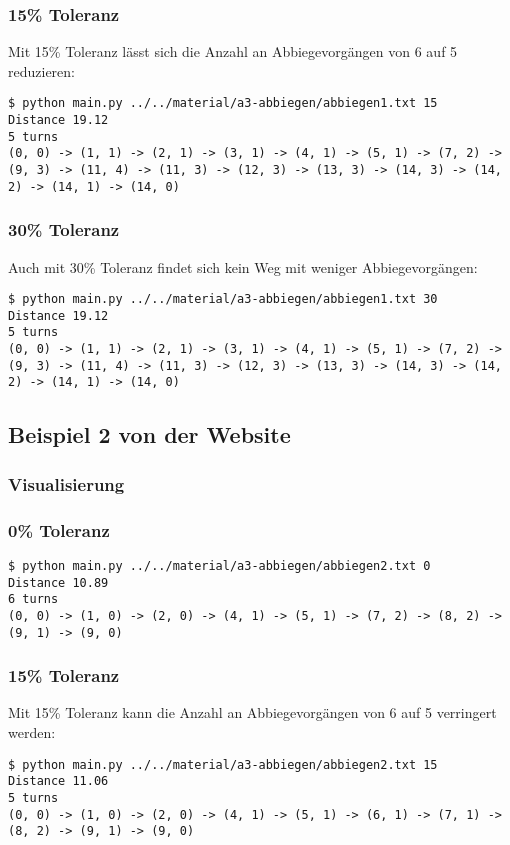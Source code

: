 \documentclass[a4paper,10pt,ngerman]{scrartcl}
\begin{document}
\subsubsection{15\% Toleranz}
Mit 15\% Toleranz lässt sich die Anzahl an Abbiegevorgängen von 6 auf 5 reduzieren:
\begin{lstlisting}
$ python main.py ../../material/a3-abbiegen/abbiegen1.txt 15
Distance 19.12
5 turns
(0, 0) -> (1, 1) -> (2, 1) -> (3, 1) -> (4, 1) -> (5, 1) -> (7, 2) -> (9, 3) -> (11, 4) -> (11, 3) -> (12, 3) -> (13, 3) -> (14, 3) -> (14, 2) -> (14, 1) -> (14, 0)
\end{lstlisting}

\subsubsection{30\% Toleranz}
Auch mit 30\% Toleranz findet sich kein Weg mit weniger Abbiegevorgängen:
\begin{lstlisting}
$ python main.py ../../material/a3-abbiegen/abbiegen1.txt 30
Distance 19.12
5 turns
(0, 0) -> (1, 1) -> (2, 1) -> (3, 1) -> (4, 1) -> (5, 1) -> (7, 2) -> (9, 3) -> (11, 4) -> (11, 3) -> (12, 3) -> (13, 3) -> (14, 3) -> (14, 2) -> (14, 1) -> (14, 0)
\end{lstlisting}


\subsection{Beispiel 2 von der Website}
\subsubsection{Visualisierung}


\subsubsection{0\% Toleranz}
\begin{lstlisting}
$ python main.py ../../material/a3-abbiegen/abbiegen2.txt 0
Distance 10.89
6 turns
(0, 0) -> (1, 0) -> (2, 0) -> (4, 1) -> (5, 1) -> (7, 2) -> (8, 2) -> (9, 1) -> (9, 0)
\end{lstlisting}

\subsubsection{15\% Toleranz}
Mit 15\% Toleranz kann die Anzahl an Abbiegevorgängen von 6 auf 5 verringert werden:
\begin{lstlisting}
$ python main.py ../../material/a3-abbiegen/abbiegen2.txt 15
Distance 11.06
5 turns
(0, 0) -> (1, 0) -> (2, 0) -> (4, 1) -> (5, 1) -> (6, 1) -> (7, 1) -> (8, 2) -> (9, 1) -> (9, 0)
\end{lstlisting}
\end{document}
